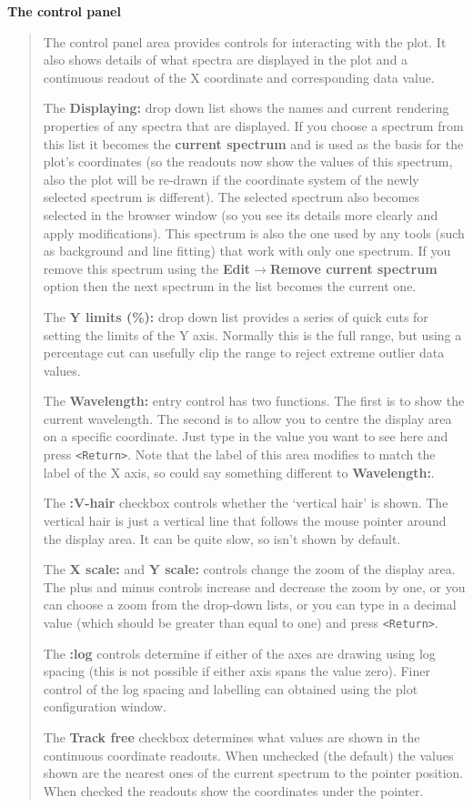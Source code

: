 \documentclass[twoside,11pt]{article}
\newcommand{\latexhtml}[2]{#1}
\renewcommand{\_}{\texttt{\symbol{95}}}
\newcommand{\submenuitem}[2]{\latexhtml{\textbf{#1$\rightarrow$#2}}{\textbf{#1->#2}}}
\newcommand{\labelitem}[1]{\textbf{#1}}
\newcommand{\hitext}[1]{\texttt{#1}}
\newcommand{\subheading}[1]{\textbf{\large{#1}}}
\begin{document}
\subheading{The control panel}
\begin{quote}
 The control panel area provides controls for interacting with the
 plot. It also shows details of what spectra are displayed in the plot
 and a continuous readout of the X coordinate and corresponding data
 value.

 The \labelitem{Displaying:} drop down list shows the names and current
 rendering properties of any spectra that are displayed. If you choose a
 spectrum from this list it becomes the \labelitem{current spectrum} and is
 used as the basis for the plot's coordinates (so the readouts now show the
 values of this spectrum, also the plot will be re-drawn if the coordinate
 system of the newly selected spectrum is different). The selected spectrum
 also becomes selected in the browser window (so you see its details more
 clearly and apply modifications). This spectrum is also the one used by any
 tools (such as background and line fitting) that work with only one
 spectrum. If you remove this spectrum using the \submenuitem{Edit}{Remove
 current spectrum} option then the next spectrum in the list becomes the
 current one.

 The \labelitem{Y limits (\%):} drop down list provides a series of
 quick cuts for setting the limits of the Y axis. Normally this is the
 full range, but using a percentage cut can usefully clip the range to
 reject extreme outlier data values.

 The \labelitem{Wavelength:} entry control has two functions. The
 first is to show the current wavelength. The second is to allow you
 to centre the display area on a specific coordinate. Just type in the
 value you want to see here and press \hitext{<Return>}. Note that the
 label of this area modifies to match the label of the X axis, so
 could say something different to \labelitem{Wavelength:}.

 The \labelitem{:V-hair} checkbox controls whether the `vertical hair'
 is shown. The vertical hair is just a vertical line that follows the
 mouse pointer around the display area. It can be quite slow, so isn't
 shown by default.

 The \labelitem{X scale:} and \labelitem{Y scale:} controls change the
 zoom of the display area. The plus and minus controls increase and
 decrease the zoom by one, or you can choose a zoom from the drop-down
 lists, or you can type in a decimal value (which should be greater
 than equal to one) and press \hitext{<Return>}.

 The \labelitem{:log} controls determine if either of the axes are drawing
 using log spacing (this is not possible if either axis spans the value
 zero). Finer control of the log spacing and labelling can obtained using the
 plot configuration window.

 The \labelitem{Track free} checkbox determines what values are shown in the
 continuous coordinate readouts. When unchecked (the default) the values
 shown are the nearest ones of the current spectrum to the pointer position.
 When checked the readouts show the coordinates under the pointer.

\end{quote}
\end{document}
